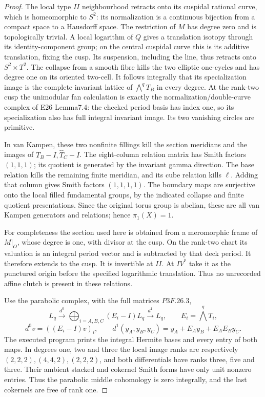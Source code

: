 \begin{proof}
The local type \(II\) neighbourhood retracts onto its cuspidal rational curve, which is homeomorphic to \(S^2\): its normalization is a continuous bijection from a compact space to a Hausdorff space. The restriction of \(M\) has degree zero and is topologically trivial. A local logarithm of \(Q\) gives a translation isotopy through its identity-component group; on the central cuspidal curve this is its additive translation, fixing the cusp. Its suspension, including the line, thus retracts onto \(S^2\times T^2\). The collapse from a smooth fibre kills the two elliptic one-cycles and has degree one on its oriented two-cell. It follows integrally that its specialization image is the complete invariant lattice of \(\bigwedge^qT_B\) in every degree. At the rank-two cusp the unimodular fan calculation is exactly the normalization/double-curve complex of E26 Lemma7.4: the checked period basis has index one, so its specialization also has full integral invariant image. Its two vanishing circles are primitive.

In van Kampen, these two nonfinite fillings kill the section meridians and the images of \(\widehat T_B-I,\widehat T_C-I\). The eight-column relation matrix has Smith factors \((1,1,1)\); its quotient is generated by the invariant gamma direction. The base relation kills the remaining finite meridian, and its cube relation kills \(\ell\). Adding that column gives Smith factors \((1,1,1,1)\). The boundary maps are surjective onto the local filled fundamental groups, by the indicated collapse and finite quotient presentations. Since the original torus group is abelian, these are all van Kampen generators and relations; hence \(\pi_1(X)=1\).

For completeness the section used here is obtained from a meromorphic frame of \(M|_O\), whose degree is one, with divisor at the cusp. On the rank-two chart its valuation is an integral period vector and is subtracted by that deck period. It therefore extends to the cusp. It is invertible at \(II\). At \(IV^*\) take it as the punctured origin before the specified logarithmic translation. Thus no unrecorded affine clutch is present in these relations.

Use the parabolic complex, with the full matrices \(P3F.26.3\), \[
 L_q\xrightarrow{d^0}\bigoplus_{i=A,B,C}(E_i-I)L_q
       \xrightarrow{d^1}L_q,
 \qquad E_i=\bigwedge^qT_i,
\] \[
 d^0v=((E_i-I)v)_i,
 \qquad d^1(y_A,y_B,y_C)=y_A+E_Ay_B+E_AE_By_C.
\] The executed program prints the integral Hermite bases and every entry of both maps. In degrees one, two and three the local image ranks are respectively \((2,2,2),(4,4,2),(2,2,2)\), and both differentials have ranks three, five and three. Their ambient stacked and cokernel Smith forms have only unit nonzero entries. Thus the parabolic middle cohomology is zero integrally, and the last cokernels are free of rank one.


\end{proof}
